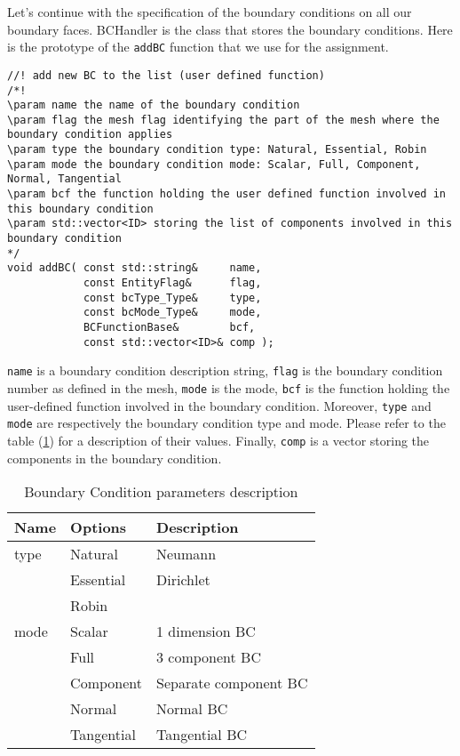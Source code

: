 Let's continue with the specification of the boundary conditions on all our boundary faces. BCHandler is the class that stores the boundary conditions. Here is the prototype of the \verb!addBC! function that we use for the assignment.
\small
\begin{verbatim}
//! add new BC to the list (user defined function)
/*!
\param name the name of the boundary condition
\param flag the mesh flag identifying the part of the mesh where the boundary condition applies
\param type the boundary condition type: Natural, Essential, Robin
\param mode the boundary condition mode: Scalar, Full, Component, Normal, Tangential
\param bcf the function holding the user defined function involved in this boundary condition
\param std::vector<ID> storing the list of components involved in this boundary condition
*/
void addBC( const std::string&     name,
            const EntityFlag&      flag,
            const bcType_Type&     type,
            const bcMode_Type&     mode,
            BCFunctionBase&        bcf,
            const std::vector<ID>& comp );
\end{verbatim}
\normalsize
\verb!name! is a boundary condition description string,
\verb!flag! is the boundary condition number as defined in the mesh,
\verb!mode! is the mode, \verb!bcf! is the function holding the user-defined function involved
in the boundary condition. Moreover, \verb!type! and \verb!mode! are respectively the boundary condition type
and mode. Please refer to the table (\ref{table-bcparams}) for a description of their values.
Finally, \verb!comp! is a vector storing the components in the boundary condition.\\

\begin{table}
\begin{center}
\begin{tabular}{|l|l|l|}
\hline
Name & Options & Description \\
\hline \hline
type &  Natural & Neumann\\
& Essential & Dirichlet \\
& Robin&\\

\hline
mode & Scalar & 1 dimension BC \\
& Full & 3 component BC \\
& Component  & Separate component BC \\
& Normal & Normal BC \\
& Tangential & Tangential BC \\
\hline

\end{tabular}
\end{center}
\caption{ Boundary Condition parameters description
}
\label{table-bcparams}
\end{table}



